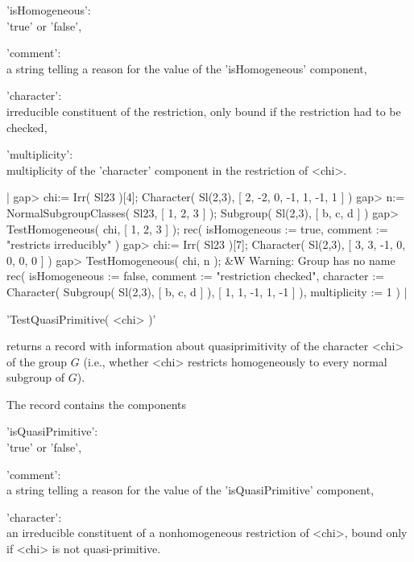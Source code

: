 'isHomogeneous': \\  'true' or 'false',

'comment':       \\  a string telling a reason for the value of the
                     'isHomogeneous' component,

'character':     \\  irreducible constituent of the restriction, only
                     bound if the restriction had to be checked,

'multiplicity':  \\  multiplicity of the 'character' component in the
                     restriction of <chi>.


|    gap> chi:= Irr( Sl23 )[4];
    Character( Sl(2,3), [ 2, -2, 0, -1, 1, -1, 1 ] )
    gap> n:= NormalSubgroupClasses( Sl23, [ 1, 2, 3 ] );
    Subgroup( Sl(2,3), [ b, c, d ] )
    gap> TestHomogeneous( chi, [ 1, 2, 3 ] );
    rec(
      isHomogeneous := true,
      comment := "restricts irreducibly" )
    gap> chi:= Irr( Sl23 )[7];
    Character( Sl(2,3), [ 3, 3, -1, 0, 0, 0, 0 ] )
    gap> TestHomogeneous( chi, n );
    &W  Warning: Group has no name
    rec(
      isHomogeneous := false,
      comment := "restriction checked",
      character := Character( Subgroup( Sl(2,3), [ b, c, d ] ),
        [ 1, 1, -1, 1, -1 ] ),
      multiplicity := 1 ) |


'TestQuasiPrimitive( <chi> )'

returns a record with information about quasiprimitivity of the character
<chi> of the group $G$ (i.e., whether <chi> restricts homogeneously
to every normal subgroup of $G$).

The record contains the components

'isQuasiPrimitive':  \\ 'true' or 'false',

'comment':           \\  a string telling a reason for the value of the
                         'isQuasiPrimitive' component,

'character':  \\ an irreducible constituent of a nonhomogeneous
                 restriction of <chi>, bound only if <chi> is not
                 quasi-primitive.

\vspace{5mm}

